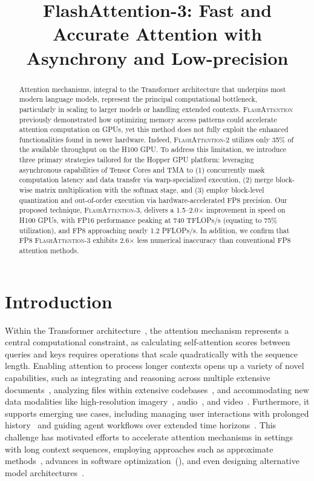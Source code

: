 \title{FlashAttention-3: Fast and Accurate Attention with Asynchrony and Low-precision}

\begin{abstract}
Attention mechanisms, integral to the Transformer architecture that underpins most modern language models, represent the principal computational bottleneck, particularly in scaling to larger models or handling extended contexts. \textsc{FlashAttention} previously demonstrated how optimizing memory access patterns could accelerate attention computation on GPUs, yet this method does not fully exploit the enhanced functionalities found in newer hardware. Indeed, \textsc{FlashAttention-2} utilizes only 35\% of the available throughput on the H100 GPU. To address this limitation, we introduce three primary strategies tailored for the Hopper GPU platform: leveraging asynchronous capabilities of Tensor Cores and TMA to (1) concurrently mask computation latency and data transfer via warp-specialized execution, (2) merge block-wise matrix multiplication with the softmax stage, and (3) employ block-level quantization and out-of-order execution via hardware-accelerated FP8 precision. Our proposed technique, \textsc{FlashAttention-3}, delivers a 1.5–2.0$\times$ improvement in speed on H100 GPUs, with FP16 performance peaking at 740 TFLOPs/s (equating to 75\% utilization), and FP8 approaching nearly 1.2 PFLOPs/s. In addition, we confirm that FP8 \textsc{FlashAttention-3} exhibits 2.6$\times$ less numerical inaccuracy than conventional FP8 attention methods.
\end{abstract}

\section{Introduction}
\label{sec:intro}

Within the Transformer architecture~\citep{vaswani2017attention}, the attention mechanism represents a central computational constraint, as calculating self-attention scores between queries and keys requires operations that scale quadratically with the sequence length. Enabling attention to process longer contexts opens up a variety of novel capabilities, such as integrating and reasoning across multiple extensive documents~\citep{guo2021longt5,shaham2022scrolls,peng2023yarn}, analyzing files within extensive codebases~\citep{roziere2023code, li2023starcoder}, and accommodating new data modalities like high-resolution imagery~\citep{chen2022scaling}, audio~\citep{gulati2020conformer}, and video~\citep{ho2022video}. Furthermore, it supports emerging use cases, including managing user interactions with prolonged history~\citep{sun2019bert4rec} and guiding agent workflows over extended time horizons~\citep{yao2022react}. This challenge has motivated efforts to accelerate attention mechanisms in settings with long context sequences, employing approaches such as approximate methods~\citep{katharopoulos2020transformers,choromanski2020rethinking, tay2020efficient}, advances in software optimization~(\citep{rabe2021self,dao2022flashattention,kwon2023efficient}), and even designing alternative model architectures~\citep{peng2023rwkv,sun2023retentive,gu2023mamba}.

